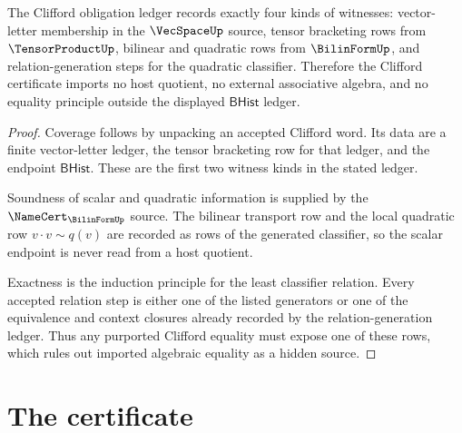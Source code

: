 \begin{theorem}\label{thm:clifford-universal-ledger-exactness-obligations}
The Clifford obligation ledger records exactly four kinds of witnesses:
vector-letter membership in the $\VecSpaceUp$ source, tensor bracketing rows
from $\TensorProductUp$, bilinear and quadratic rows from $\BilinFormUp$, and
relation-generation steps for the quadratic classifier. Therefore the
Clifford certificate imports no host quotient, no external associative
algebra, and no equality principle outside the displayed $\mathsf{BHist}$ ledger.
\end{theorem}
\begin{proof}
Coverage follows by unpacking an accepted Clifford word. Its data are a
finite vector-letter ledger, the tensor bracketing row for that ledger, and
the endpoint $\mathsf{BHist}$. These are the first two witness kinds in the stated
ledger.

Soundness of scalar and quadratic information is supplied by the
$\NameCert_{\BilinFormUp}$ source. The bilinear transport row and the local
quadratic row $v \cdot v \sim q(v)$ are recorded as rows of the generated
classifier, so the scalar endpoint is never read from a host quotient.

Exactness is the induction principle for the least classifier relation. Every
accepted relation step is either one of the listed generators or one of the
equivalence and context closures already recorded by the relation-generation
ledger. Thus any purported Clifford equality must expose one of these rows,
which rules out imported algebraic equality as a hidden source.
\end{proof}

\section{The certificate}
\label{sec:clifford-certificate}

